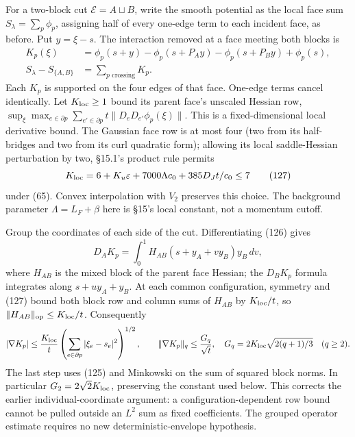 \documentclass[11pt,a4paper]{article}
\begin{document}
For a two-block cut \(\mathcal E=A\sqcup B\), write the smooth potential
as the local face sum \(S_\lambda=\sum_p\phi_p\), assigning half of
every one-edge term to each incident face, as before. Put \(y=\xi-s\).
The interaction removed at a face meeting both blocks is
\[\begin{aligned}
K_p(\xi)&=\phi_p(s+y)-\phi_p(s+P_Ay)
                 -\phi_p(s+P_By)+\phi_p(s),\\
S_\lambda-S_{\{A,B\}}&=\sum_{p\text{ crossing}}K_p.
\end{aligned}
\tag{126}\] Each \(K_p\) is supported on the four edges of that face.
One-edge terms cancel identically. Let \(K_{\rm loc}\ge1\) bound its
parent face's unscaled Hessian row,
\(\sup_\xi\max_{e\in\partial p} \sum_{e'\in\partial p}t\|D_eD_{e'}\phi_p(\xi)\|\).
This is a fixed-dimensional local derivative bound. The Gaussian face
row is at most four (two from its half-bridges and two from its curl
quadratic form); allowing its local saddle-Hessian perturbation by two,
§15.1's product rule permits
\[K_{\rm loc}=6+K_u\varepsilon+7000\Lambda c_0
                         +385D_Jt/c_0\le7\tag{127}\] under (65). Convex
interpolation with \(V_2\) preserves this choice. The background
parameter \(\Lambda=L_F+\beta\) here is §15's local constant, not a
momentum cutoff.

Group the coordinates of each side of the cut. Differentiating (126)
gives \[D_AK_p=\int_0^1 H_{AB}(s+y_A+v y_B)y_B\,dv,\] where \(H_{AB}\)
is the mixed block of the parent face Hessian; the \(D_BK_p\) formula
integrates along \(s+u y_A+y_B\). At each common configuration, symmetry
and (127) bound both block row and column sums of \(H_{AB}\) by
\(K_{\rm loc}/t\), so \(\|H_{AB}\|_{\rm op}\le K_{\rm loc}/t\).
Consequently \[|\nabla K_p|\le\frac{K_{\rm loc}}t
 \left(\sum_{e\in\partial p}|\xi_e-s_e|^2\right)^{1/2},
\qquad
\|\nabla K_p\|_q\le\frac{G_q}{\sqrt t},\quad
G_q=2K_{\rm loc}\sqrt{2(q+1)/3}\quad(q\ge2).\] The last step uses (125)
and Minkowski on the sum of squared block norms. In particular
\(G_2=2\sqrt2K_{\rm loc}\), preserving the constant used below. This
corrects the earlier individual-coordinate argument: a
configuration-dependent row bound cannot be pulled outside an \(L^2\)
sum as fixed coefficients. The grouped operator estimate requires no new
deterministic-envelope hypothesis.
\end{document}
